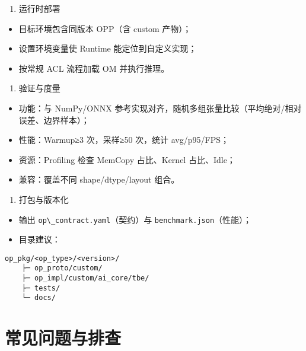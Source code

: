 \begin{enumerate}
\def\labelenumi{\arabic{enumi}.}
\setcounter{enumi}{5}
\tightlist
\item
  运行时部署
\end{enumerate}

\begin{itemize}
\tightlist
\item
  目标环境包含同版本 OPP（含 custom 产物）；
\item
  设置环境变量使 Runtime 能定位到自定义实现；
\item
  按常规 ACL 流程加载 OM 并执行推理。
\end{itemize}

\begin{enumerate}
\def\labelenumi{\arabic{enumi}.}
\setcounter{enumi}{6}
\tightlist
\item
  验证与度量
\end{enumerate}

\begin{itemize}
\tightlist
\item
  功能：与 NumPy/ONNX
  参考实现对齐，随机多组张量比较（平均绝对/相对误差、边界样本）；
\item
  性能：Warmup≥3 次，采样≥50 次，统计 avg/p95/FPS；
\item
  资源：Profiling 检查 MemCopy 占比、Kernel 占比、Idle；
\item
  兼容：覆盖不同 shape/dtype/layout 组合。
\end{itemize}

\begin{enumerate}
\def\labelenumi{\arabic{enumi}.}
\setcounter{enumi}{7}
\tightlist
\item
  打包与版本化
\end{enumerate}

\begin{itemize}
\tightlist
\item
  输出 \passthrough{\lstinline!op\_contract.yaml!}（契约）与
  \passthrough{\lstinline!benchmark.json!}（性能）；
\item
  目录建议：
\end{itemize}

\begin{lstlisting}
op_pkg/<op_type>/<version>/
    ├─ op_proto/custom/
    ├─ op_impl/custom/ai_core/tbe/
    ├─ tests/
    └─ docs/
\end{lstlisting}

\section{常见问题与排查}\label{ux5e38ux89c1ux95eeux9898ux4e0eux6392ux67e5}


